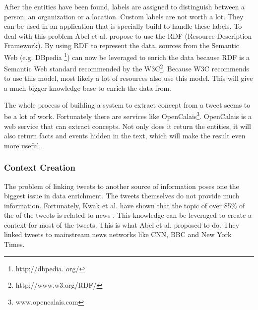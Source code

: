 \documentclass{article}
\begin{document}
After the entities have been found, labels are assigned to distinguish between a person, an organization or a location. Custom labels are not worth a lot. They can be used in an application that is specially build to handle these labels. To deal with this problem Abel et al. propose to use the RDF (Resource Description Framework).\cite{AdaptiveSearch} By using RDF to represent the data, sources from the Semantic Web (e.g. DBpedia \footnote{http://dbpedia.
org/}) can now be leveraged to enrich the data because RDF is a Semantic Web standard recommended by the W3C\footnote{http://www.w3.org/RDF/}. Because W3C recommends to use this model, most likely a lot of resources also use this model. This will give a much bigger knowledge base to enrich the data from.

The whole process of building a system to extract concept from a tweet seems to be a lot of work. Fortunately there are services like OpenCalais\footnote{www.opencalais.com}. OpenCalais is a web service that can extract concepts. Not only does it return the entities, it will also return facts and events hidden in the text, which will make the result even more useful.
\subsubsection{Context Creation}
The problem of linking tweets to another source of information poses one the biggest issue in data enrichment. The tweets themselves do not provide much information. Fortunately, Kwak et al. have shown that the topic of over 85\% of the of the tweets is related to news \cite{newsmedia}. This knowledge can be leveraged to create a context for most of the tweets.  This is what Abel et al. proposed to do\cite{enrichmentForProfiling}. They linked tweets to mainstream news networks like CNN, BBC and New York Times.
\end{document}
